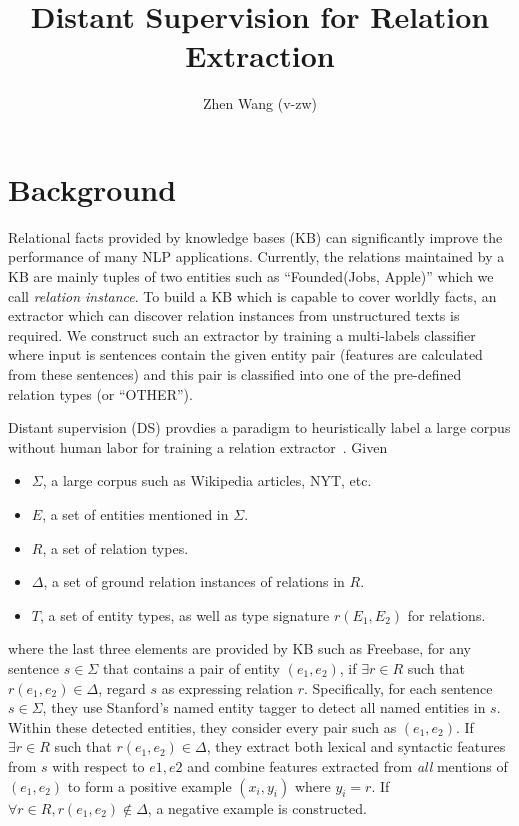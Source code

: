 \documentclass[10pt]{article} %
\title{Distant Supervision for Relation Extraction}
\author{Zhen Wang (v-zw)}
\theoremstyle{definition}
\theoremstyle{definition}
\begin{document}
\maketitle
\section{Background}
Relational facts provided by knowledge bases (KB) can significantly improve the performance of many NLP applications. 
Currently, the relations maintained by a KB are mainly tuples of two entities such as ``Founded(Jobs, Apple)'' which we call \emph{relation instance}. 
To build a KB which is capable to cover worldly facts, an extractor which can discover relation instances from unstructured texts is required. 
We construct such an extractor by training a multi-labels classifier where input is sentences contain the given entity pair (features are calculated from these sentences) and this pair is classified into one of the pre-defined relation types (or ``OTHER''). 


Distant supervision (DS) provdies a paradigm to heuristically label a large corpus without human labor for training a relation extractor~\cite{mintz}. 
Given 
\begin{itemize}
\item $\Sigma$, a large corpus such as Wikipedia articles, NYT, etc.
\item $E$, a set of entities mentioned in $\Sigma$. 
\item $R$, a set of relation types. 
\item $\Delta$, a set of ground relation instances of relations in $R$. 
\item $T$, a set of entity types, as well as type signature $r(E_1,E_2)$ for relations. 
\end{itemize}
where the last three elements are provided by KB such as Freebase, 
for any sentence $s\in\Sigma$ that contains a pair of entity $(e_1,e_2)$, if $\exists{}r\in{}R$ such that $r(e_1,e_2)\in\Delta$, regard $s$ as expressing relation $r$. 
Specifically, for each sentence $s\in\Sigma$, they use Stanford's named entity tagger to detect all named entities in $s$. 
Within these detected entities, they consider every pair such as $(e_1,e_2)$. 
If $\exists{}r\in{}R$ such that $r(e_1,e_2)\in\Delta$, they extract both lexical and syntactic features from $s$ with respect to $e1,e2$ and combine features extracted from \emph{all} mentions of $(e_1,e_2)$ 
to form a positive example $(x_i,y_i)$ where $y_i=r$. 
If $\forall{}r\in{}R,r(e_1,e_2)\notin\Delta$, a negative example is constructed. 
\end{document}
